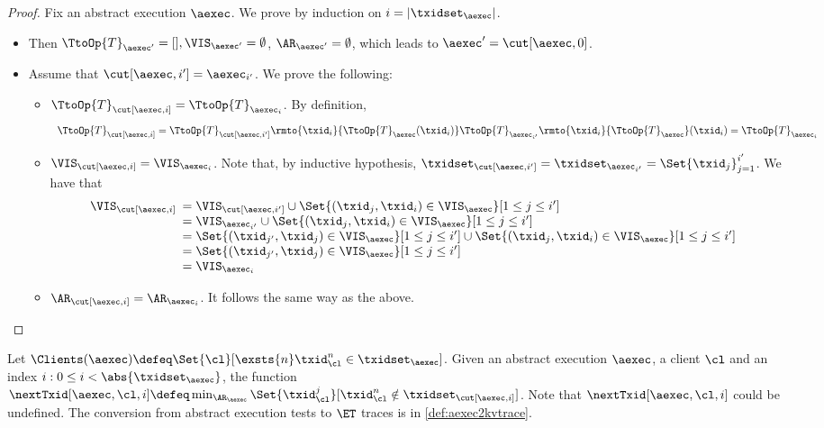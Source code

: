 \begin{proof}
Fix an abstract execution $\aexec$. We prove by induction on $i = \lvert \txidset_{\aexec} \rvert$.
\begin{itemize}
\item {} Then $\TtoOp{T}_{\aexec'} = [], \VIS_{\aexec'} = \emptyset$, 
$\AR_{\aexec'} = \emptyset$, which leads to $\aexec' = \cut[\aexec, 0]$. 
\item {} 
Assume that $\cut[\aexec, i'] = \aexec_{i'}$. 
We prove the following: 
\begin{itemize}
\item $\TtoOp{T}_{\cut[\aexec, i]} = \TtoOp{T}_{\aexec_i}$. 
By definition, 
\[
    \begin{array}{l}
\TtoOp{T}_{\cut[\aexec,i]} = \TtoOp{T}_{\cut[\aexec, i']}\rmto{\txid_{i}}{\TtoOp{T}_{\aexec}(\txid_{i})} 
\TtoOp{T}_{\aexec_{i'}}\rmto{\txid_{i}}{\TtoOp{T}_{\aexec}}(\txid_{i}) = \TtoOp{T}_{\aexec_{i}}
\end{array}
\]
\item $\VIS_{\cut[\aexec, i]} = \VIS_{\aexec_{i}}$. 
Note that, by inductive hypothesis, $\txidset_{\cut[\aexec, i']} = \txidset_{\aexec_{i'}} = \Set{\txid_{j}}_{j=1}^{i'}$. 
We have that  
\[
\begin{array}{l}
    \VIS_{\cut[\aexec, i]}
    \begin{array}[t]{l}
    = \VIS_{\cut[\aexec, i']} \cup \Set{(\txid_j, \txid_{i}) \in \VIS_{\aexec}}[1 \leq j \leq i'] \\ 
    = \VIS_{\aexec_{i'}} \cup \Set{(\txid_{j}, \txid_{i}) \in \VIS_{\aexec} }[ 1 \leq j \leq i'] \\ 
    = \Set{(\txid_{j'}, \txid_{j}) \in \VIS_{\aexec}}[1 \leq j \leq i'] \cup \Set{(\txid_{j}, \txid_{i}) \in \VIS_{\aexec}}[1 \leq j \leq i'] \\
    = \Set{(\txid_{j'}, \txid_{j}) \in \VIS_{\aexec}}[1 \leq j \leq i'] \\
    = \VIS_{\aexec_{i}}
    \end{array}
\end{array}
\]
\item $\AR_{\cut[\aexec, i]} = \AR_{\aexec_{i}}$. It follows the same way 
as the above. 
\end{itemize}
\end{itemize}
\end{proof}

Let $\Clients(\aexec) \defeq \Set{\cl}[\exsts{ n } \txid_{\cl}^{n} \in \txidset_{\aexec}]$.
Given an abstract execution $\aexec$, a client $\cl$ and an index $i : 0 \leq i < \abs{\txidset_\aexec}$,
the function $\nextTxid[\aexec, \cl, i] \defeq \min_{\AR_{\aexec}} \Set{\txid_{\cl}^{j} }[ \txid_{\cl}^{n} \notin \txidset_{\cut[\aexec, i]}]$. 
Note that $\nextTxid[\aexec, \cl, i]$ could be undefined. 
The conversion from abstract execution tests to \( \ET \) traces is in \cref{def:aexec2kvtrace}.

